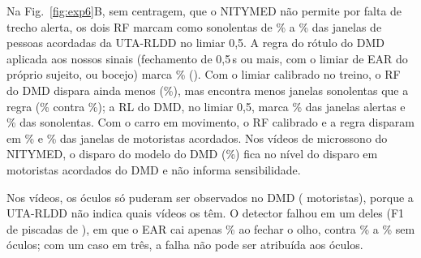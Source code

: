 \documentclass[conference]{IEEEtran}
\begin{document}
Na Fig.~\ref{fig:exp6}B, sem centragem, que o NITYMED não permite por falta de trecho alerta, os dois RF marcam como sonolentas de \ExpSeisDisparoModeloDMDUTAAlerta\% a \ExpSeisDisparoModeloUTAUTAAlerta\% das janelas de pessoas acordadas da UTA-RLDD no limiar 0,5. A regra do rótulo do DMD aplicada aos nossos sinais (fechamento de 0,5\,s ou mais, com o limiar de EAR do próprio sujeito, ou bocejo) marca \ExpSeisDisparoRegraUTAAlerta\% (\ExpSeisDisparoRegraUTAAlertaIC). Com o limiar calibrado no treino, o RF do DMD dispara ainda menos (\ExpSeisDisparoModeloDMDCalUTAAlerta\%), mas encontra menos janelas sonolentas que a regra (\ExpSeisDisparoModeloDMDCalUTASonolento\% contra \ExpSeisDisparoRegraUTASonolento\%); a RL do DMD, no limiar 0,5, marca \ExpSeisDisparoModeloDMDLRUTAAlerta\% das janelas alertas e \ExpSeisDisparoModeloDMDLRUTASonolento\% das sonolentas. Com o carro em movimento, o RF calibrado e a regra disparam em \ExpSeisDisparoModeloDMDCalDMDMovimento\% e \ExpSeisDisparoRegraDMDMovimento\% das janelas de motoristas acordados. Nos vídeos de microssono do NITYMED, o disparo do modelo do DMD (\ExpSeisDisparoModeloDMDMicrossono\%) fica no nível do disparo em motoristas acordados do DMD e não informa sensibilidade.

Nos vídeos, os óculos só puderam ser observados no DMD (\ExpCincoBMotoristasOculos{} motoristas), porque a UTA-RLDD não indica quais vídeos os têm. O detector falhou em um deles (F1 de piscadas de \ExpCincoBOculosFalhaFUm), em que o EAR cai apenas \ExpCincoBOculosFalhaQuedaEAR\% ao fechar o olho, contra \ExpCincoBSemOculosQuedaEARMin\% a \ExpCincoBSemOculosQuedaEARMax\% sem óculos; com um caso em três, a falha não pode ser atribuída aos óculos.
\end{document}
